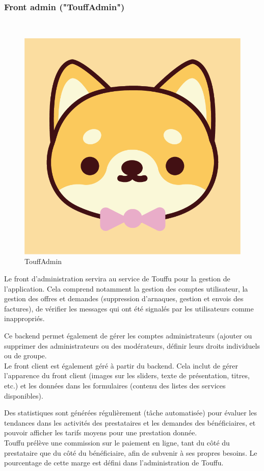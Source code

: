 \documentclass[conference]{IEEEtran}
\begin{document}
\subsubsection{Front admin ("TouffAdmin")}\hfill\\

\begin{figure}[h]
	\centering
	\includegraphics[width=0.4\columnwidth]{Ressources/Icons/v1_3@3x.png}
	\caption{TouffAdmin}
	\label{fig:logotouffadmin}
\end{figure}

Le front d'administration servira au service de Touffu pour la gestion de l'application. Cela comprend notamment la gestion des comptes utilisateur, la gestion des offres et demandes (suppression d'arnaques, gestion et envois des factures), de vérifier les messages qui ont été signalés par les utilisateurs comme inappropriés.

Ce backend permet également de gérer les comptes administrateurs (ajouter ou supprimer des administrateurs ou des modérateurs, définir leurs droits individuels ou de groupe.\\

Le front client est également géré à partir du backend. Cela inclut de gérer l'apparence du front client (images sur les sliders, texte de présentation, titres, etc.) et les données dans les formulaires (contenu des listes des services disponibles).

Des statistiques sont générées régulièrement (tâche automatisée) pour évaluer les tendances dans les activités des prestataires et les demandes des bénéficiaires, et pouvoir afficher les tarifs moyens pour une prestation donnée.\\

Touffu prélève une commission sur le paiement en ligne, tant du côté du prestataire que du côté du bénéficiaire, afin de subvenir à ses propres besoins. Le pourcentage de cette marge est défini dans l'administration de Touffu.\\
\end{document}
